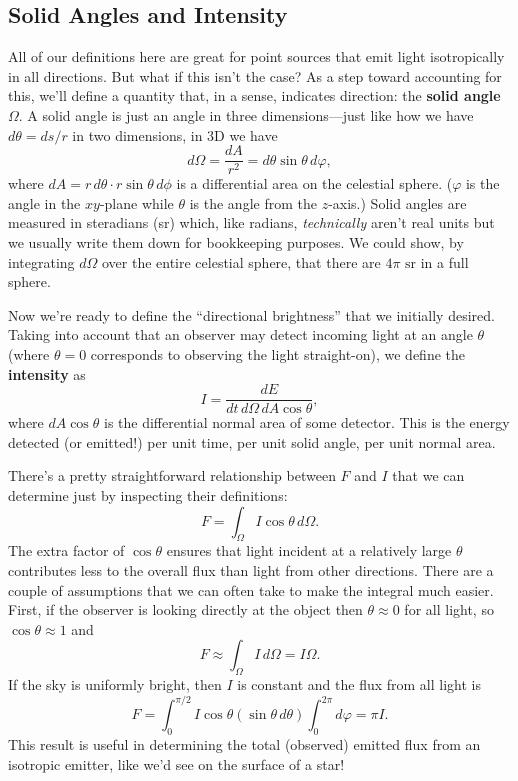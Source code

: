 \documentclass[../a062main.tex]{subfiles}
\begin{document}
\subsection*{Solid Angles and Intensity}
All of our definitions here are great for point sources that emit light isotropically in all directions.
But what if this isn't the case?
As a step toward accounting for this, we'll define a quantity that, in a sense, indicates direction: the \textbf{solid angle} $\Omega$.
A solid angle is just an angle in three dimensions---just like how we have $d\theta = ds/r$ in two dimensions, in 3D we have
\[ \boxed{d \Omega = \frac{dA}{r^2} = d\theta \sin \theta \,d\varphi}, \]
where $dA = r\,d\theta \cdot r \sin \theta \,d\phi$ is a differential area on the celestial sphere.
($\varphi$ is the angle in the $xy$-plane while $\theta$ is the angle from the $z$-axis.)
Solid angles are measured in steradians (sr) which, like radians, \textit{technically} aren't real units but we usually write them down for bookkeeping purposes.
We could show, by integrating $d\Omega$ over the entire celestial sphere, that there are $4\pi \textrm{ sr}$ in a full sphere.

Now we're ready to define the ``directional brightness'' that we initially desired.
Taking into account that an observer may detect incoming light at an angle $\theta$ (where $\theta = 0$ corresponds to observing the light straight-on), we define the \textbf{intensity} as
\[ \boxed{I = \frac{dE}{dt \, d\Omega \, dA \cos \theta}}, \]
where $dA \cos \theta$ is the differential normal area of some detector.
This is the energy detected (or emitted!) per unit time, per unit solid angle, per unit normal area.

There's a pretty straightforward relationship between $F$ and $I$ that we can determine just by inspecting their definitions:
\[ F = \int_{\Omega}^{} I \cos \theta \,d\Omega. \]
The extra factor of $\cos \theta$ ensures that light incident at a relatively large $\theta$ contributes less to the overall flux than light from other directions.
There are a couple of assumptions that we can often take to make the integral much easier.
First, if the observer is looking directly at the object then $\theta \approx 0$ for all light, so $\cos \theta \approx 1$ and
\[ F \approx \int_{\Omega}^{} I \,d\Omega = I \Omega. \]
If the sky is uniformly bright, then $I$ is constant and the flux from all light is
\[ F = \int_{0}^{\pi / 2} I \cos\theta (\sin\theta \,d\theta) \int_{0}^{2\pi}d\varphi = \pi I. \]
This result is useful in determining the total (observed) emitted flux from an isotropic emitter, like we'd see on the surface of a star!
\end{document}
